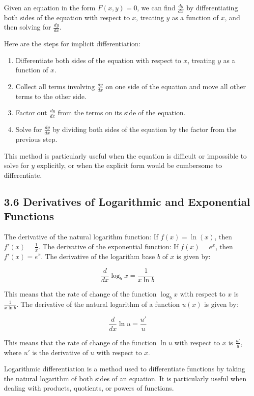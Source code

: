 \documentclass{article}
\begin{document}
Given an equation in the form \(F(x, y) = 0\), we can find \(\frac{dy}{dx}\) by differentiating both sides of the equation with respect to \(x\), treating \(y\) as a function of \(x\), and then solving for \(\frac{dy}{dx}\).

Here are the steps for implicit differentiation:

\begin{enumerate}
\item Differentiate both sides of the equation with respect to \(x\), treating \(y\) as a function of \(x\).
\item Collect all terms involving \(\frac{dy}{dx}\) on one side of the equation and move all other terms to the other side.
\item Factor out \(\frac{dy}{dx}\) from the terms on its side of the equation.
\item Solve for \(\frac{dy}{dx}\) by dividing both sides of the equation by the factor from the previous step.
\end{enumerate}

This method is particularly useful when the equation is difficult or impossible to solve for \(y\) explicitly, or when the explicit form would be cumbersome to differentiate.

\subsection{3.6 Derivatives of Logarithmic and Exponential Functions}
The derivative of the natural logarithm function: If \(f(x) = \ln(x)\), then \(f'(x) = \frac{1}{x}\).
The derivative of the exponential function: If \(f(x) = e^x\), then \(f'(x) = e^x\).
The derivative of the logarithm base \(b\) of \(x\) is given by:

\[\frac{d}{dx} \log_b x = \frac{1}{{x \ln b}}\]

This means that the rate of change of the function \(\log_b x\) with respect to \(x\) is \(\frac{1}{{x \ln b}}\).
The derivative of the natural logarithm of a function \(u(x)\) is given by:

\[\frac{d}{dx} \ln u = \frac{{u'}}{{u}}\]

This means that the rate of change of the function \(\ln u\) with respect to \(x\) is \(\frac{{u'}}{{u}}\), where \(u'\) is the derivative of \(u\) with respect to \(x\).

Logarithmic differentiation is a method used to differentiate functions by taking the natural logarithm of both sides of an equation. It is particularly useful when dealing with products, quotients, or powers of functions.
\end{document}
